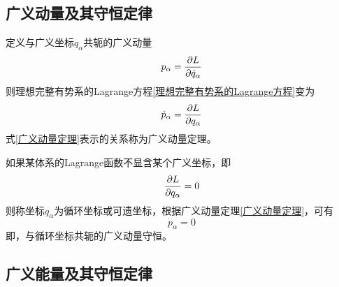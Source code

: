 \subsection{广义动量及其守恒定律}

定义与广义坐标$q_\alpha$共轭的{\heiti 广义动量}
\begin{equation}
	p_\alpha = \frac{\partial L}{\partial \dot{q}_\alpha}
	\label{广义动量定义}
\end{equation}
则理想完整有势系的Lagrange方程\eqref{理想完整有势系的Lagrange方程}变为
\begin{equation}
	\dot{p}_\alpha = \frac{\partial L}{\partial q_\alpha}
	\label{广义动量定理}
\end{equation}
式\eqref{广义动量定理}表示的关系称为{\heiti 广义动量定理}。

如果某体系的Lagrange函数不显含某个广义坐标，即
\begin{equation*}
	\frac{\partial L}{\partial q_\alpha} = 0
\end{equation*}
则称坐标$q_\alpha$为{\heiti 循环坐标}或{\heiti 可遗坐标}，根据广义动量定理\eqref{广义动量定理}，可有
\begin{equation}
	\dot{p}_\alpha = 0
\end{equation}
即，与循环坐标共轭的广义动量守恒。

\subsection{广义能量及其守恒定律}

